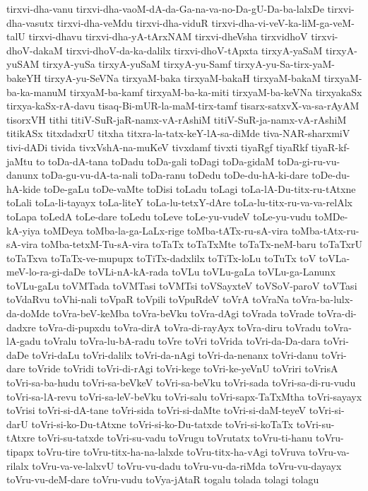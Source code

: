 {tirxvi-dha-vanu
tirxvi-dha-vaoM-dA-da-Ga-na-va-no-Da-gU-Da-ba-lalxDe
tirxvi-dha-vasutx
tirxvi-dha-veMdu
tirxvi-dha-viduR
tirxvi-dha-vi-veV-ka-liM-ga-veM-talU
tirxvi-dhavu
tirxvi-dha-yA-tArxNAM
tirxvi-dheVsha
tirxvidhoV
tirxvi-dhoV-dakaM
tirxvi-dhoV-da-ka-dalilx
tirxvi-dhoV-tApxta
tirxyA-yaSaM
tirxyA-yuSAM
tirxyA-yuSa
tirxyA-yuSaM
tirxyA-yu-Samf
tirxyA-yu-Sa-tirx-yaM-bakeYH
tirxyA-yu-SeVNa
tirxyaM-baka
tirxyaM-bakaH
tirxyaM-bakaM
tirxyaM-ba-ka-manuM
tirxyaM-ba-kamf
tirxyaM-ba-ka-miti
tirxyaM-ba-keVNa
tirxyakaSx
tirxya-kaSx-rA-davu
tisaq-Bi-mUR-la-maM-tirx-tamf
tisarx-satxvX-va-sa-rAyAM
tisorxVH
tithi
titiV-SuR-jaR-namx-vA-rAshiM
titiV-SuR-ja-namx-vA-rAshiM
titikASx
titxdadxrU
titxha
titxra-la-tatx-keY-lA-sa-diMde
tiva-NAR-sharxmiV
tivi-dADi
tivida
tivxVshA-na-muKeV
tivxdamf
tivxti
tiyaRgf
tiyaRkf
tiyaR-kf-jaMtu
to
toDa-dA-tana
toDadu
toDa-gali
toDagi
toDa-gidaM
toDa-gi-ru-vu-danunx
toDa-gu-vu-dA-ta-nali
toDa-ranu
toDedu
toDe-du-hA-ki-dare
toDe-du-hA-kide
toDe-gaLu
toDe-vaMte
toDisi
toLadu
toLagi
toLa-lA-Du-titx-ru-tAtxne
toLali
toLa-li-tayayx
toLa-liteY
toLa-lu-tetxY-dAre
toLa-lu-titx-ru-va-va-relAlx
toLapa
toLedA
toLe-dare
toLedu
toLeve
toLe-yu-vudeV
toLe-yu-vudu
toMDe-kA-yiya
toMDeya
toMba-la-ga-LaLx-rige
toMba-tATx-ru-sA-vira
toMba-tAtx-ru-sA-vira
toMba-tetxM-Tu-sA-vira
toTaTx
toTaTxMte
toTaTx-neM-baru
toTaTxrU
toTaTxva
toTaTx-ve-mupupx
toTiTx-dadxlilx
toTiTx-loLu
toTuTx
toV
toVLa-meV-lo-ra-gi-daDe
toVLi-nA-kA-rada
toVLu
toVLu-gaLa
toVLu-ga-Lanunx
toVLu-gaLu
toVMTada
toVMTasi
toVMTsi
toVSayxteV
toVSoV-paroV
toVTasi
toVdaRvu
toVhi-nali
toVpaR
toVpili
toVpuRdeV
toVrA
toVraNa
toVra-ba-lulx-da-doMde
toVra-beV-keMba
toVra-beVku
toVra-dAgi
toVrada
toVrade
toVra-di-dadxre
toVra-di-pupxdu
toVra-dirA
toVra-di-rayAyx
toVra-diru
toVradu
toVra-lA-gadu
toVralu
toVra-lu-bA-radu
toVre
toVri
toVrida
toVri-da-Da-dara
toVri-daDe
toVri-daLu
toVri-dalilx
toVri-da-nAgi
toVri-da-nenanx
toVri-danu
toVri-dare
toVride
toVridi
toVri-di-rAgi
toVri-kege
toVri-ke-yeVnU
toVriri
toVrisA
toVri-sa-ba-hudu
toVri-sa-beVkeV
toVri-sa-beVku
toVri-sada
toVri-sa-di-ru-vudu
toVri-sa-lA-revu
toVri-sa-leV-beVku
toVri-salu
toVri-sapx-TaTxMtha
toVri-sayayx
toVrisi
toVri-si-dA-tane
toVri-sida
toVri-si-daMte
toVri-si-daM-teyeV
toVri-si-darU
toVri-si-ko-Du-tAtxne
toVri-si-ko-Du-tatxde
toVri-si-koTaTx
toVri-su-tAtxre
toVri-su-tatxde
toVri-su-vadu
toVrugu
toVrutatx
toVru-ti-hanu
toVru-tipapx
toVru-tire
toVru-titx-ha-na-lalxde
toVru-titx-ha-vAgi
toVruva
toVru-va-rilalx
toVru-va-ve-lalxvU
toVru-vu-dadu
toVru-vu-da-riMda
toVru-vu-dayayx
toVru-vu-deM-dare
toVru-vudu
toVya-jAtaR
togalu
tolada
tolagi
tolagu
}
